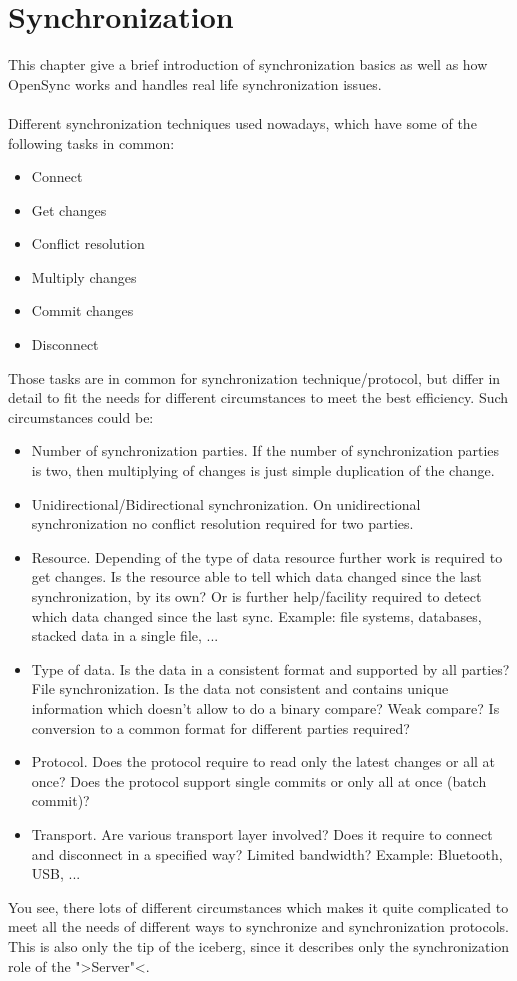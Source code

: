 \chapter{Synchronization}
This chapter give a brief introduction of synchronization basics as well as how
OpenSync works and handles real life synchronization issues.\\
\\
Different synchronization techniques used nowadays, which have some of the
following tasks in common:
\begin{itemize}
 \item Connect
 \item Get changes
 \item Conflict resolution
 \item Multiply changes
 \item Commit changes
 \item Disconnect
\end{itemize}
Those tasks are in common for synchronization technique/protocol, but differ in
detail to fit the needs for different circumstances to meet the best efficiency.
Such circumstances could be:
\begin{itemize}
 \item Number of synchronization parties. If the number of synchronization
 parties is two, then multiplying of changes is just simple duplication of the
 change.
 \item Unidirectional/Bidirectional synchronization. On unidirectional
 synchronization no conflict resolution required for two parties.
 \item Resource. Depending of the type of data resource further work is required
 to get changes. Is the resource able to tell which data changed since the last
 synchronization, by its own? Or is further help/facility required to detect
 which data changed since the last sync. Example: file systems, databases,
 stacked data in a single file, ...
 \item Type of data. Is the data in a consistent format and supported by all
 parties? File synchronization. Is the data not consistent and contains unique
 information which doesn't allow to do a binary compare? Weak compare? Is 
 conversion to a common format for different parties required?
 \item Protocol. Does the protocol require to read only the latest changes or 
 all at once? Does the protocol support single commits or only all at once 
 (batch commit)?
 \item Transport. Are various transport layer involved? Does it require to
 connect and disconnect in a specified way? Limited bandwidth? Example: 
 Bluetooth, USB, ...
\end{itemize}
You see, there lots of different circumstances which makes it quite complicated
to meet all the needs of different ways to synchronize and synchronization 
protocols.\\
This is also only the tip of the iceberg, since it describes only the
synchronization role of the ">Server"<. 

